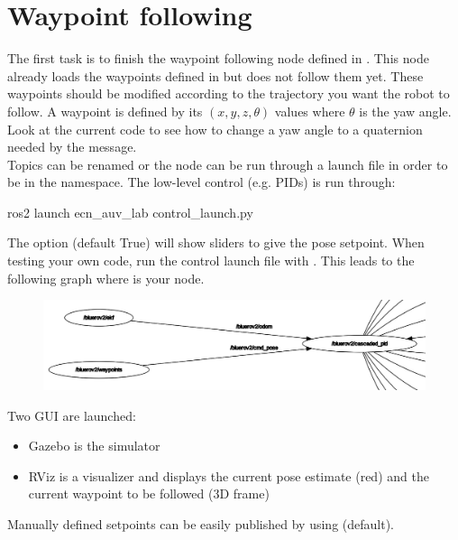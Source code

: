 \documentclass{ecnreport}
\begin{document}
\section{Waypoint following}

The first task is to finish the waypoint following node defined in . This node already loads the waypoints defined in  but does not follow them yet.
These waypoints should be modified according to the trajectory you want the robot to follow. A waypoint is defined by its $(x,y,z,\theta)$ values where $\theta$ is the yaw angle. Look at the current
code to see how to change a yaw angle to a quaternion needed by the  message.\\

Topics can be renamed or the node can be run through a launch file in order to be in the  namespace. The low-level control (e.g. PIDs) is run through:
\begin{bashcodelarge}
 ros2 launch ecn_auv_lab control_launch.py
 \end{bashcodelarge}

 The  option (default True) will show sliders to give the pose setpoint. When testing your own code, run the control launch file with .
This leads to the following graph where  is your node.
\begin{figure}[h]\centering
 \includegraphics[width=.8\linewidth]{graph}
\end{figure}

Two GUI are launched: 
\begin{itemize}
 \item Gazebo is the simulator
 \item RViz is a visualizer and displays the current pose estimate (red) and the current waypoint to be followed (3D frame)
\end{itemize}

Manually defined setpoints can be easily published by using  (default).\\
\end{document}
